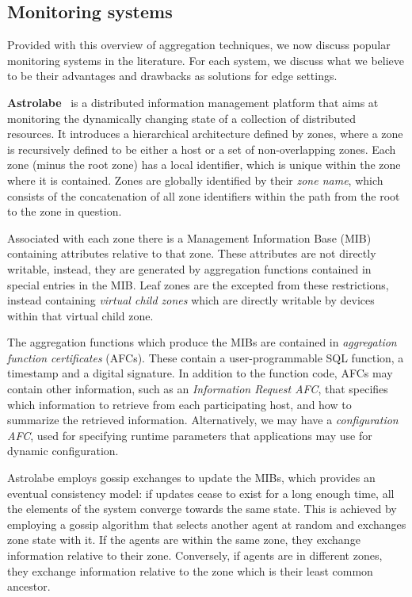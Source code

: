 \subsection{Monitoring systems}

Provided with this overview of aggregation techniques, we now discuss popular monitoring systems in the literature. For each system, we discuss what we believe to be their advantages and drawbacks as solutions for edge settings.

\textbf{Astrolabe}~\cite{Renesse2003} is a distributed information management platform that aims at monitoring the dynamically changing state of a collection of distributed resources. It introduces a hierarchical architecture defined by zones, where a zone is recursively defined to be either a host or a set of non-overlapping zones. Each zone (minus the root zone) has a local identifier, which is unique within the zone where it is contained. Zones are globally identified by their \textit{zone name}, which consists of the concatenation of all zone identifiers within the path from the root to the zone in question.

Associated with each zone there is a Management Information Base (MIB) containing attributes relative to that zone. These attributes are not directly writable, instead, they are generated by aggregation functions contained in special entries in the MIB. Leaf zones are the excepted from these restrictions, instead containing \textit{virtual child zones} which are directly writable by devices within that virtual child zone.

The aggregation functions which produce the MIBs are contained in \textit{aggregation function certificates} (AFCs). These contain a user-programmable SQL function, a timestamp and a digital signature. In addition to the function code, AFCs may contain other information, such as an \textit{Information Request AFC}, that specifies which information to retrieve from each participating host, and how to summarize the retrieved information. Alternatively, we may have a \textit{configuration AFC}, used for specifying runtime parameters that applications may use for dynamic configuration.

Astrolabe employs gossip exchanges to update the MIBs, which provides an eventual consistency model: if updates cease to exist for a long enough time, all the elements of the system converge towards the same state. This is achieved by employing a gossip algorithm that selects another agent at random and exchanges zone state with it. If the agents are within the same zone, they exchange information relative to their zone. Conversely, if agents are in different zones, they exchange information relative to the zone which is their least common ancestor.

